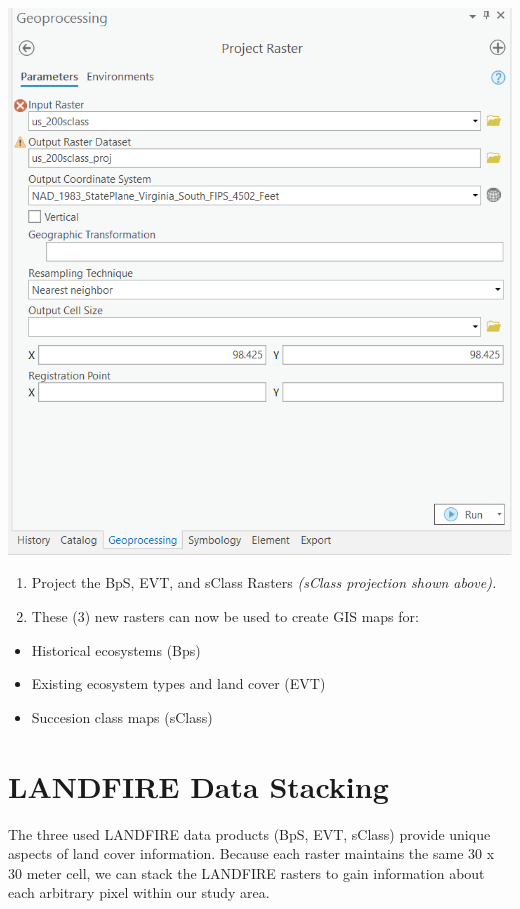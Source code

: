 \documentclass[
]{book}
\providecommand{\tightlist}{%
  \setlength{\itemsep}{0pt}\setlength{\parskip}{0pt}}
\begin{document}
\includegraphics[width=1000pt]{04_gis_screenshots/5_raster_project}

\begin{enumerate}
\def\labelenumi{\arabic{enumi}.}
\setcounter{enumi}{2}
\tightlist
\item
  Project the BpS, EVT, and sClass Rasters \emph{(sClass projection shown above).}
\item
  These (3) new rasters can now be used to create GIS maps for:
\end{enumerate}

\begin{itemize}
\tightlist
\item
  Historical ecosystems (Bps)
\item
  Existing ecosystem types and land cover (EVT)
\item
  Succesion class maps (sClass)
\end{itemize}

\hypertarget{landfire-data-stacking}{%
\section{LANDFIRE Data Stacking}\label{landfire-data-stacking}}

The three used LANDFIRE data products (BpS, EVT, sClass) provide unique aspects of land cover information. Because each raster maintains the same 30 x 30 meter cell, we can stack the LANDFIRE rasters to gain information about each arbitrary pixel within our study area.
\end{document}
